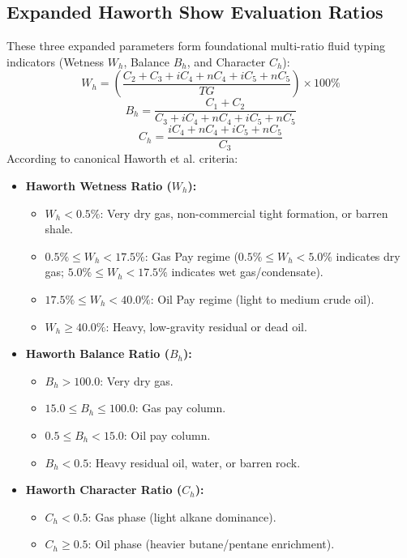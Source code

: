 \subsection{Expanded Haworth Show Evaluation Ratios \citep{haworth1985, ref12}}
These three expanded parameters form foundational multi-ratio fluid typing indicators (Wetness $W_h$, Balance $B_h$, and Character $C_h$):
\begin{equation}
    W_h = \left( \frac{C_2 + C_3 + iC_4 + nC_4 + iC_5 + nC_5}{TG} \right) \times 100\%
\end{equation}
\begin{equation}
    B_h = \frac{C_1 + C_2}{C_3 + iC_4 + nC_4 + iC_5 + nC_5}
\end{equation}
\begin{equation}
    C_h = \frac{iC_4 + nC_4 + iC_5 + nC_5}{C_3}
\end{equation}
According to canonical Haworth et al. criteria:
\begin{itemize}
    \item \textbf{Haworth Wetness Ratio ($W_h$):}
    \begin{itemize}
        \item $W_h < 0.5\%$: Very dry gas, non-commercial tight formation, or barren shale.
        \item $0.5\% \le W_h < 17.5\%$: Gas Pay regime ($0.5\% \le W_h < 5.0\%$ indicates dry gas; $5.0\% \le W_h < 17.5\%$ indicates wet gas/condensate).
        \item $17.5\% \le W_h < 40.0\%$: Oil Pay regime (light to medium crude oil).
        \item $W_h \ge 40.0\%$: Heavy, low-gravity residual or dead oil.
    \end{itemize}
    \item \textbf{Haworth Balance Ratio ($B_h$):}
    \begin{itemize}
        \item $B_h > 100.0$: Very dry gas.
        \item $15.0 \le B_h \le 100.0$: Gas pay column.
        \item $0.5 \le B_h < 15.0$: Oil pay column.
        \item $B_h < 0.5$: Heavy residual oil, water, or barren rock.
    \end{itemize}
    \item \textbf{Haworth Character Ratio ($C_h$):}
    \begin{itemize}
        \item $C_h < 0.5$: Gas phase (light alkane dominance).
        \item $C_h \ge 0.5$: Oil phase (heavier butane/pentane enrichment).
    \end{itemize}
\end{itemize}

